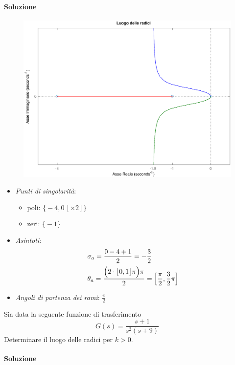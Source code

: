 \paragraph{Soluzione}

\begin{figure}[ht]
	\centering
	\includegraphics[scale=.6]{mod1/assets/rl_ex35}
\end{figure}

\begin{itemize}
	\item \emph{Punti di singolarità}:
		\begin{itemize}
			\item poli: \(\bigl\{ -4, 0\,[\times 2] \bigr\}\)
			\item zeri: \(\bigl\{ -1 \bigr\}\)
		\end{itemize}
	\item \emph{Asintoti}:
		\begin{align*}
			& \sigma_a = \frac{0-4+1}{2} = -\frac{3}{2} \\
			& \theta_a = \frac{\Bigl( 2 \cdot \bigl[ 0,1 \bigr] \pi \Bigr) \pi}{2} = \Bigl[ \frac{\pi}{2}, \frac{3}{2}\pi \Bigr]
		\end{align*}
	\item \emph{Angoli di partenza dei rami}: \(\frac{\pi}{2}\)
\end{itemize}


\exercise{}
Sia data la seguente funzione di trasferimento
\[
	G(s) = \frac{s+1}{s^2 (s+9)}
\]
Determinare il luogo delle radici per \(k>0\).

\paragraph{Soluzione}

